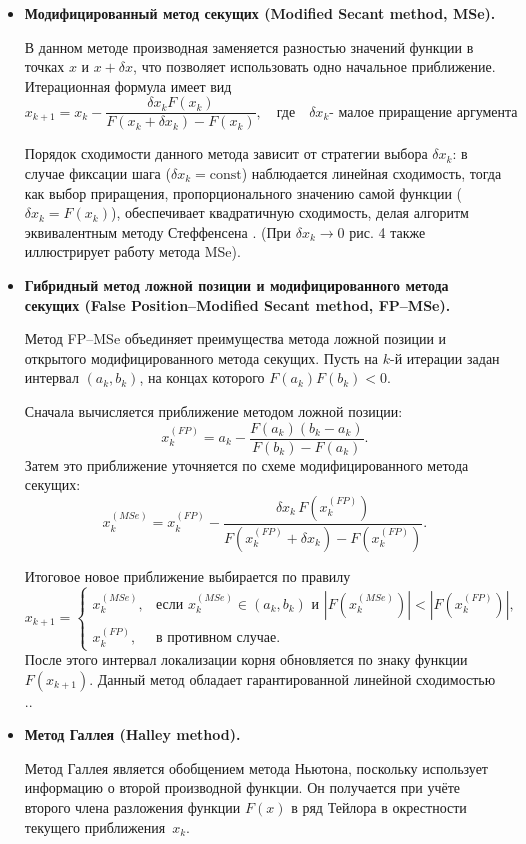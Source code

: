\documentclass[12pt,a4paper]{article}
\theoremstyle{bigplain}
\theoremstyle{plain}
\begin{document}
\begin{itemize}
\begin{minipage}{0.2\textwidth}
\small Рис. 5 Sectant
\end{minipage}

\item \textbf{Модифицированный метод секущих
(Modified Secant method, MSe).}

В данном методе производная
заменяется разностью значений
функции в точках $x$ и $x+\delta x$,
что позволяет использовать
одно начальное приближение.
Итерационная формула имеет вид
\[
x_{k+1}=x_k-
\frac{\delta x_k F(x_k)}
{F(x_k+\delta x_k)-F(x_k)}, \quad \text{где} \quad \delta x_k \text{- малое приращение аргумента}
\]

Порядок сходимости данного метода зависит
от стратегии выбора $\delta x_k$: в случае фиксации
шага ($\delta x_k = \text{const}$) наблюдается линейная сходимость, 
тогда как выбор приращения, пропорционального значению 
самой функции ($\delta x_k = F(x_k)$), обеспечивает
квадратичную сходимость, делая алгоритм эквивалентным
методу Стеффенсена \cite{Press,Steffensen}. (При $\delta x_k \to 0$ рис. 4 также иллюстрирует работу метода  MSe).

\item \textbf{Гибридный метод ложной позиции и модифицированного метода секущих
(False Position--Modified Secant method, FP--MSe).}

Метод FP--MSe объединяет преимущества метода ложной позиции
и открытого модифицированного метода секущих.
Пусть на $k$-й итерации задан интервал $(a_k,b_k)$,
на концах которого $F(a_k)F(b_k)<0$.

Сначала вычисляется приближение методом ложной позиции:
\[
x_k^{(FP)} = a_k - \frac{F(a_k)(b_k-a_k)}{F(b_k)-F(a_k)}.
\]
Затем это приближение уточняется по схеме
модифицированного метода секущих:
\[
x_k^{(MSe)} = x_k^{(FP)} -
\frac{\delta x_k\,F(x_k^{(FP)})}
{F(x_k^{(FP)}+\delta x_k)-F(x_k^{(FP)})}.
\]

Итоговое новое приближение выбирается по правилу
\[
x_{k+1}=
\begin{cases}
x_k^{(MSe)}, & \text{если } x_k^{(MSe)}\in(a_k,b_k)
\text{ и } |F(x_k^{(MSe)})|<|F(x_k^{(FP)})|,\\[2mm]
x_k^{(FP)}, & \text{в противном случае}.
\end{cases}
\]
После этого интервал локализации корня обновляется
по знаку функции $F(x_{k+1})$.
Данный метод обладает гарантированной линейной сходимостью \cite{Badr}..

\item \textbf{Метод Галлея (Halley method).}

Метод Галлея является обобщением метода Ньютона,
поскольку использует информацию о второй производной функции.
Он получается при учёте второго члена разложения
функции $F(x)$ в ряд Тейлора в окрестности текущего
приближения~$x_k$.


\end{itemize}
\end{document}
